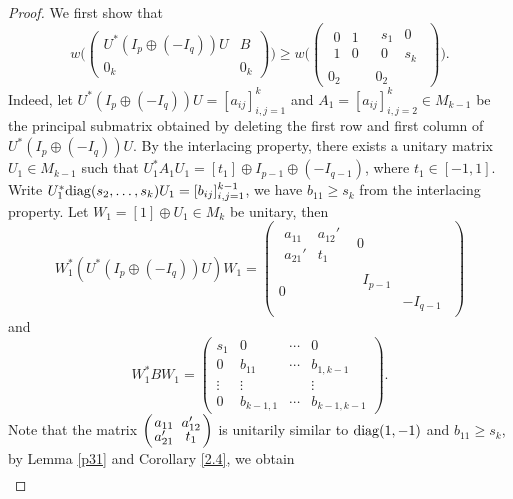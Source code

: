 \documentclass[11pt]{article}
\numberwithin{equation}{section}
\def\diag{{\rm diag}}
\begin{document}
\begin{proof}
We first show that
$$w\Big(\begin{pmatrix} U^*(I_p\oplus(-I_q))U & B\\ 0_k & 0_k\end{pmatrix}\Big) \ge  w\Big(\left(\begin{array}{c|c}\begin{array}{cc} 0 & 1\\ 1 & 0\end{array} & \begin{array}{cc} s_1 & 0\\ 0 & s_k\end{array}
\\ \hline 0_2 & 0_2\end{array}\right)\Big).$$
Indeed, let $U^*(I_p\oplus(-I_q))U=[a_{ij}]_{i,j=1}^k$ and $A_1=[a_{ij}]_{i,j=2}^k\in M_{k-1}$ be the principal submatrix obtained by deleting the first row and first column of $U^*(I_p\oplus(-I_q))U$. By the interlacing property, there exists a unitary matrix $U_1\in M_{k-1}$ such that $U_1^*A_1U_1=[t_1]\oplus I_{p-1}\oplus (-I_{q-1})$, where $t_1\in [-1, 1]$. Write $U_1^*\diag(s_2, \dots, s_k)U_1=[b_{ij}]_{i,j=1}^{k-1}$, we have $b_{11}\ge s_k$ from the interlacing property. Let $W_1=[1]\oplus U_1\in M_k$ be unitary, then
$$W_1^*(U^*(I_p\oplus(-I_q))U)W_1=\left(\begin{array}{c|c} \begin{array}{cc} a_{11} & a_{12}'\\ a_{21}' & t_1 \end{array} & 0 \\ \hline 0 & \begin{array}{cc} I_{p-1} & \\  & -I_{q-1}\end{array} \end{array}\right)$$
and
$$W_1^*BW_1=\left(\begin{array}{cc|cc} s_1 & 0 &  \cdots & 0 \\ 0 & b_{11} &  \cdots & b_{1, k-1} \\ \hline \vdots & \vdots &  & \vdots\\ 0 & b_{k-1, 1} & \cdots & b_{k-1, k-1}\end{array}\right).$$
Note that the matrix $\left({\textstyle a_{11}\atop  \textstyle a_{21}'} \ {\textstyle a_{12}' \atop \textstyle t_1}\right)$ is unitarily similar to $\diag(1, -1)$ and $b_{11}\ge s_k$, by Lemma \ref{p31} and Corollary \ref{2.4}, we obtain
\begin{eqnarray*}

\end{eqnarray*}
\end{proof}
\end{document}

